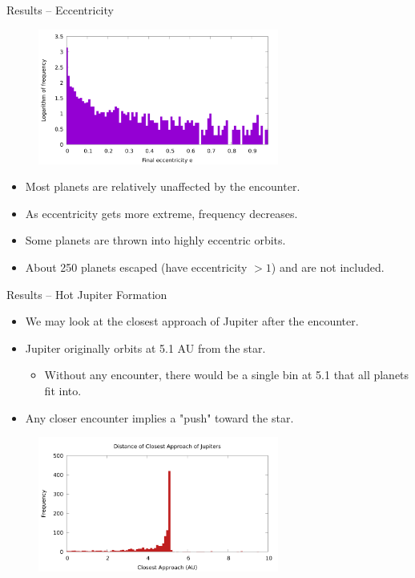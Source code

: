 \documentclass{beamer}
\begin{document}
\begin{frame}{Results -- Eccentricity}
    \begin{figure}
        \centering
        \includegraphics[height=1.75in]{eccentricity_final}
    \end{figure}
    \begin{itemize}
        \item Most planets are relatively unaffected by the encounter.
        \item As eccentricity gets more extreme, frequency decreases.
        \item Some planets are thrown into highly eccentric orbits.
        \item About 250 planets escaped (have eccentricity $> 1$) and are not included.
    \end{itemize}
\end{frame}

\begin{frame}{Results -- Hot Jupiter Formation}
    \begin{itemize}
        \item We may look at the closest approach of Jupiter after the encounter.
        \item Jupiter originally orbits at 5.1 AU from the star.
            \begin{itemize}
                \item Without any encounter, there would be a single bin at 5.1 that
                    all planets fit into.
            \end{itemize}
        \item Any closer encounter implies a "push" toward the star.
    \end{itemize}
    \begin{figure}
        \centering
        \includegraphics[height=1.75in]{jupiter_distance_final}
    \end{figure}
\end{frame}
\end{document}
